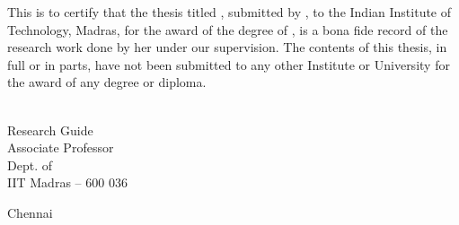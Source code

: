 \documentclass[synopsis,MS]             %
              {iitmdiss}
\begin{document}
\title{\mythesistitle}

\author{\myname}

\date{\MakeUppercase {\mysubmissionmonth}}
\department{\MakeUppercase {\mydept}}

\maketitle

\certificate

\vspace*{0.5in}

\noindent 
This is to certify that the thesis titled {\bf \mythesistitle},
submitted by {\bf \myname}, to the Indian Institute of Technology,
Madras, for the award of the degree of {\bf \mydegree}, is
a bona fide record of the research work done by her under our
supervision.  The contents of this thesis, in full or in parts, have
not been submitted to any other Institute or University for the award
of any degree or diploma.

\vspace*{1.5in}

\begin{singlespacing}
  \hspace*{-0.25in}
  \parbox{2.5in}{
     \\
    \noindent Research Guide \\
    \noindent Associate Professor \\
    \noindent Dept. of \mydept\\
    \noindent IIT Madras -- 600 036} \hfill
  \parbox{1.25in}{               %
    \vspace*{0.75in} 
    \noindent Chennai\\          %
    \noindent \mysubmissiondate} %
\end{singlespacing}




\acknowledgements


\end{document}
